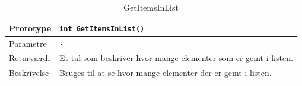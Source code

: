 \begin{table}[ht]
\begin{tabularx}{\textwidth}{| L{2.5 cm} | Z |} \hline
Prototype & \texttt{int GetItemsInList()} \\\hline
Parametre & \texttt{-} \\\hline
Returværdi & Et tal som beskriver hvor mange elementer som er gemt i listen. \\\hline
Beskrivelse & Bruges til at se hvor mange elementer der er gemt i listen. \\\hline
\end{tabularx}
\caption{GetItemsInList}
\label{table:DoublyLinkedList_GetItemsInList}
\end{table}
